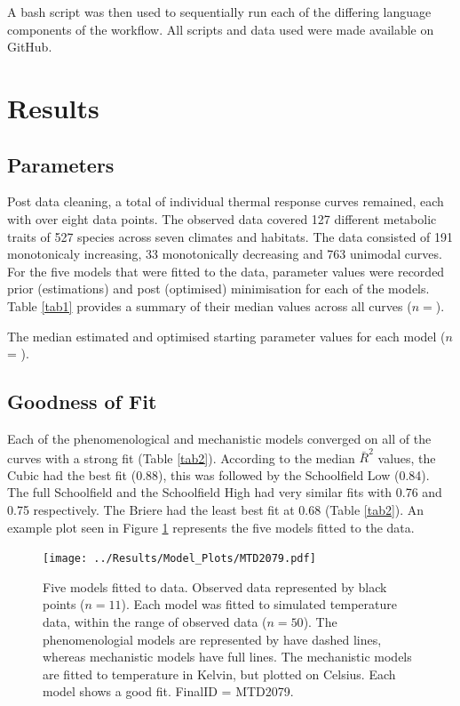 \documentclass[11pt]{article}
\newcommand{\Curves}{}
\begin{document}
	A bash script was then used to sequentially run each of the differing language components of the workflow. All scripts and data used were made available on GitHub.  
	

	
	
	
	
	
	\newpage
	
	\section{Results}
	\subsection{Parameters}
	Post data cleaning, a total of \Curves individual thermal response curves remained, each with over eight data points. The observed data covered 127 different metabolic traits of 527 species across seven climates and habitats. The data consisted of 191 monotonicaly increasing, 33 monotonically decreasing and 763 unimodal curves. For the five models that were fitted to the data, parameter values were recorded prior (estimations) and post (optimised) minimisation for each of the models. Table \ref{tab1} provides a summary of their median values across all curves (\(n = \Curves\)).
	
	\begin{table}[H]
		\centering
		\caption{The median estimated and optimised starting parameter values for each model (\(n\)= \protect\Curves).} 
		
		\label{tab1}
	\end{table}
	
	\newpage
	\subsection{Goodness of Fit}
	Each of the phenomenological and mechanistic models converged on all of the \Curves curves with a strong fit (Table \ref{tab2}). According to the median $\bar R^{2}$ values, the Cubic had the best fit (0.88), this was followed by the Schoolfield Low (0.84). The full Schoolfield and the Schoolfield High had very similar fits with 0.76 and 0.75 respectively. The Briere had the least best fit at 0.68 (Table \ref{tab2}). An example plot seen in Figure \ref{fig1} represents the five models fitted to the data.
	
	\begin{figure}[H]
		\texttt{[image: ../Results/Model\_Plots/MTD2079.pdf]}
		\caption{Five models fitted to data. Observed data represented by black points (\(n = 11\)). Each model was fitted to simulated temperature data, within the range of observed data (\(n = 50\)). The phenomenologial models are represented by have dashed lines, whereas mechanistic models have full lines. The mechanistic models are fitted to temperature in Kelvin, but plotted on Celsius. Each model shows a good fit. FinalID = MTD2079.}
		\label{fig1}
	\end{figure}
	
\end{document}
